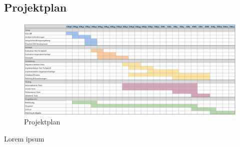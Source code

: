 \subsection*{Projektplan}

\begin{figure}[h]
    \centering
    \begin{minipage}[b]{\textwidth}
        \includegraphics[width=\textwidth]{graphics/projektplan}
        \caption{Projektplan}
    \end{minipage}\label{fig:projektplan}
\end{figure}

Lorem ipsum
\clearpage
